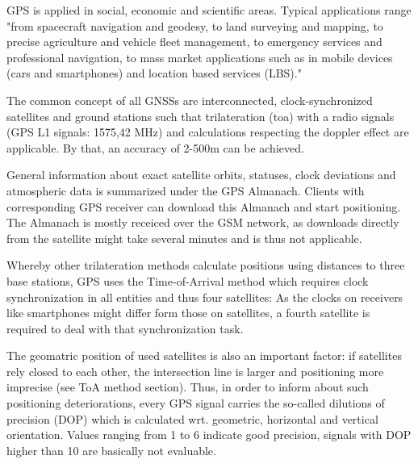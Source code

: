 GPS is applied in social, economic and scientific areas. Typical applications range "from spacecraft navigation and geodesy, to land surveying and mapping, to precise agriculture and vehicle fleet management, to emergency services and professional navigation, to mass market applications such as in mobile devices (cars and smartphones) and location based services (LBS)."\cite{liRizos}



The common concept of all GNSSs are interconnected, clock-synchronized satellites and ground stations such that trilateration (\ac{toa}) with a radio signals (GPS L1 signals: 1575,42 MHz) and calculations respecting the doppler effect are applicable. By that, an accuracy of 2-500m can be achieved.

General information about exact satellite orbits, statuses, clock deviations and atmospheric data is summarized under the GPS Almanach. Clients with corresponding GPS receiver can download this Almanach and start positioning. The Almanach is mostly receiced over the GSM network, as downloads directly from the satellite might take several minutes and is thus not applicable.

Whereby other trilateration methods calculate positions using distances to three base stations, GPS uses the Time-of-Arrival method which requires clock synchronization in all entities and thus four satellites: As the clocks on receivers like smartphones might differ form those on satellites, a fourth satellite is required to deal with that synchronization task. \cite[p. 58]{hybridizationGNSSPhd}

The geomatric position of used satellites is also an important factor: if satellites rely closed to each other, the intersection line is larger and positioning more imprecise (see ToA method section). Thus, in order to inform about such positioning deteriorations, every GPS signal carries the so-called dilutions of precision (DOP) which is calculated wrt. geometric, horizontal and vertical orientation. Values ranging from 1 to 6 indicate good precision, signals with DOP higher than 10 are basically not evaluable.

